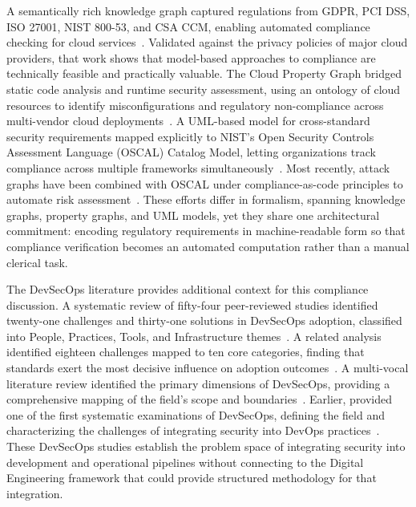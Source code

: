 A semantically rich knowledge graph captured regulations from GDPR, PCI DSS, ISO 27001, NIST 800-53, and CSA CCM, enabling automated compliance checking for cloud services~\parencite{Joshi_Elluri_2020}. Validated against the privacy policies of major cloud providers, that work shows that model-based approaches to compliance are technically feasible and practically valuable. The Cloud Property Graph bridged static code analysis and runtime security assessment, using an ontology of cloud resources to identify misconfigurations and regulatory non-compliance across multi-vendor cloud deployments~\parencite{Banse_2021}. A UML-based model for cross-standard security requirements mapped explicitly to NIST's Open Security Controls Assessment Language (OSCAL) Catalog Model, letting organizations track compliance across multiple frameworks simultaneously~\parencite{Stojkov_2021}. Most recently, attack graphs have been combined with OSCAL under compliance-as-code principles to automate risk assessment~\parencite{Koufos_2025}. These efforts differ in formalism, spanning knowledge graphs, property graphs, and UML models, yet they share one architectural commitment: encoding regulatory requirements in machine-readable form so that compliance verification becomes an automated computation rather than a manual clerical task.

The DevSecOps literature provides additional context for this compliance discussion. A systematic review of fifty-four peer-reviewed studies identified twenty-one challenges and thirty-one solutions in DevSecOps adoption, classified into People, Practices, Tools, and Infrastructure themes~\parencite{Rajapakse_2022}. A related analysis identified eighteen challenges mapped to ten core categories, finding that standards exert the most decisive influence on adoption outcomes~\parencite{Akbar_2022}. A multi-vocal literature review identified the primary dimensions of DevSecOps, providing a comprehensive mapping of the field's scope and boundaries~\parencite{Zhao_2024}. Earlier, \citeauthor{Myrbakken_2017} provided one of the first systematic examinations of DevSecOps, defining the field and characterizing the challenges of integrating security into DevOps practices~\parencite{Myrbakken_2017}. These DevSecOps studies establish the problem space of integrating security into development and operational pipelines without connecting to the Digital Engineering framework that could provide structured methodology for that integration.

